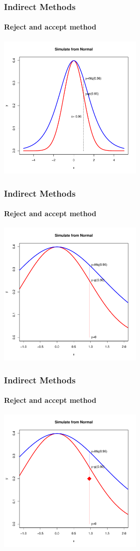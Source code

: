 \documentclass[10pt]{beamer}
\begin{document}
              \begin{frame}
                \frametitle{Indirect Methods}
                \framesubtitle{Reject and accept method}
                \begin{center}
                  \includegraphics[height=7cm]{./Pics/nmlg4.pdf}
                \end{center}
              \end{frame}
              \begin{frame}
                \frametitle{Indirect Methods}
                \framesubtitle{Reject and accept method}
                \begin{center}
                  \includegraphics[height=7cm]{./Pics/nmlg5.pdf}
                \end{center}
              \end{frame}
              \begin{frame}
                \frametitle{Indirect Methods}
                \framesubtitle{Reject and accept method}
                \begin{center}
                  \includegraphics[height=7cm]{./Pics/nmlg6.pdf}
                \end{center}
              \end{frame}
\end{document}
